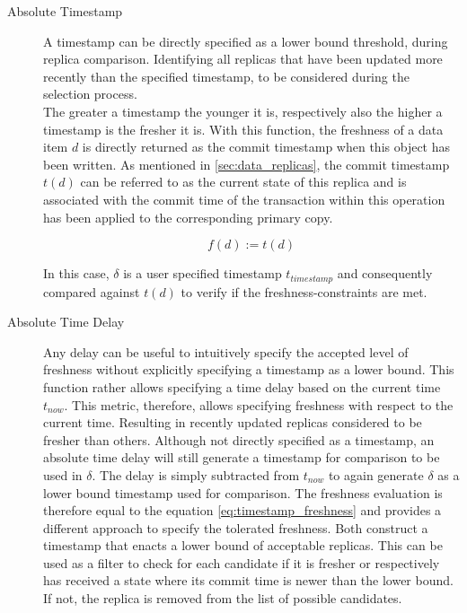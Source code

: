 \begin{description} \label{desc}
    \item [Absolute Timestamp]  A timestamp can be directly specified as a lower bound threshold, during replica comparison. Identifying all replicas that have been updated 
    more recently than the specified timestamp, to be considered during the selection process.\\
    The greater a timestamp the younger it is, respectively also the higher a timestamp is the fresher it is.
    With this function, the freshness of a data item $d$ is directly returned as the commit timestamp when this object has been written.
    As mentioned in \ref{sec:data_replicas}, the commit timestamp $t(d)$ can be referred to as the current state of this replica and is associated with the commit time 
    of the transaction within this operation has been applied to the corresponding primary copy.

    \begin{equation} \label{eq:timestamp_freshness}
        f(d) := t(d)
    \end{equation}

    In this case, $\delta$ is a user specified timestamp $t_{timestamp}$ and consequently compared against $t(d)$ to verify if the freshness-constraints are met.


    \item [Absolute Time Delay] Any delay can be useful to intuitively specify the accepted level of freshness without explicitly specifying a timestamp as a lower bound.
    This function rather allows specifying a time delay based on the current time $t_{now}$. 
    This metric, therefore, allows specifying freshness with respect to the current time. Resulting in recently updated replicas considered to be fresher than others. 
    Although not directly specified as a timestamp, an absolute time delay will still generate a timestamp for comparison to be used in $\delta$.
    The delay is simply subtracted from $t_{now}$ to again generate $\delta$ as a lower bound timestamp used for comparison.
    The freshness evaluation is therefore equal to the equation \ref{eq:timestamp_freshness} and provides a different approach to specify the tolerated freshness.
    Both construct a timestamp that enacts a lower bound of acceptable replicas.
    This can be used as a filter to check for each candidate if it is fresher or respectively has received a state where its commit time is newer 
    than the lower bound. If not, the replica is removed from the list of possible candidates. 




\end{description}
